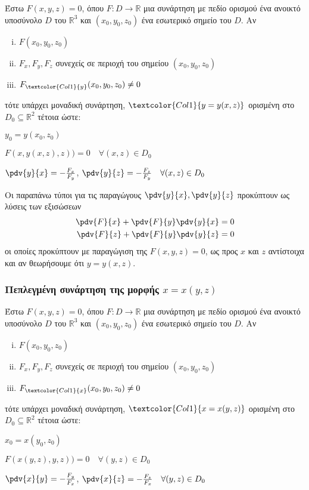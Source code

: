 Έστω $ F(x,y,z) = 0 $, όπου $F\colon D \to \mathbb{R}$ μια συνάρτηση με πεδίο ορισμού 
ένα ανοικτό υποσύνολο $ D $ του $ \mathbb{R}^{3}  $ και $ (x_0,y_0,z_0) $ ένα 
εσωτερικό σημείο του $ D $. Αν
\begin{enumerate}[(i)]
  \item $ F(x_0,y_0,z_0) $
  \item $ F_x, F_y, F_z $ συνεχείς σε περιοχή του σημείου $ (x_0,y_0,z_0) $
  \item $ F_{\textcolor{Col1}{y}}(x_0,y_0,z_0) \neq 0 $
\end{enumerate}
τότε υπάρχει μοναδική συνάρτηση, $ \textcolor{Col1}{y=y(x,z)} $ ορισμένη στο 
$ D_0 \subseteq \mathbb{R}^{2} $ τέτοια ώστε:
\begin{myitemize}
  \item $ y_0 = y(x_0,z_0) $
  \item $ F(x,y(x,z),z)) = 0  \quad \forall (x,z) \in  D_0 $
  \item $ \pdv{y}{x} = - \frac{F_x}{F_y} $, $ \pdv{y}{z} = - \frac{F_z}{F_y}\quad 
    \forall (x,z) \in D_0$
\end{myitemize}

\begin{rem}
  Οι παραπάνω τύποι για τις παραγώγους $ \pdv{y}{x}, \pdv{y}{z} $ προκύπτουν 
  ως λύσεις των εξισώσεων  
  \begin{align*}	
    \pdv{F}{x} + \pdv{F}{y}\pdv{y}{x} &= 0 \\
    \pdv{F}{z} + \pdv{F}{y}\pdv{y}{z} &= 0 
  \end{align*}
  οι οποίες προκύπτουν με παραγώγιση της $ F(x,y,z) = 0 $, ως προς $x$ και $z$ 
  αντίστοιχα και  αν θεωρήσουμε ότι $ y=y(x,z) $.
\end{rem}

\subsubsection{Πεπλεγμένη συνάρτηση της μορφής \ensuremath{x=x(y,z)}}

Έστω $ F(x,y,z) = 0 $, όπου $F\colon D \to \mathbb{R}$ μια συνάρτηση με πεδίο ορισμού 
ένα ανοικτό υποσύνολο $ D $ του $ \mathbb{R}^{3}  $ και $ (x_0,y_0,z_0) $ ένα 
εσωτερικό σημείο του $ D $. Αν
\begin{enumerate}[(i)]
  \item $ F(x_0,y_0,z_0) $
  \item $ F_x, F_y, F_z $ συνεχείς σε περιοχή του σημείου $ (x_0,y_0,z_0) $
  \item $ F_{\textcolor{Col1}{x}}(x_0,y_0,z_0) \neq 0 $
\end{enumerate}
τότε υπάρχει μοναδική συνάρτηση, $ \textcolor{Col1}{x=x(y,z)} $ ορισμένη στο 
$ D_0 \subseteq \mathbb{R}^{2} $ τέτοια ώστε:
\begin{myitemize}
  \item $ x_0 = x(y_0,z_0) $
  \item $ F(x(y,z),y,z)) = 0  \quad \forall (y,z) \in  D_0 $
  \item $ \pdv{x}{y} = - \frac{F_y}{F_x} $, $ \pdv{x}{z} = - \frac{F_z}{F_x}\quad 
    \forall (y,z) \in D_0$
\end{myitemize}

